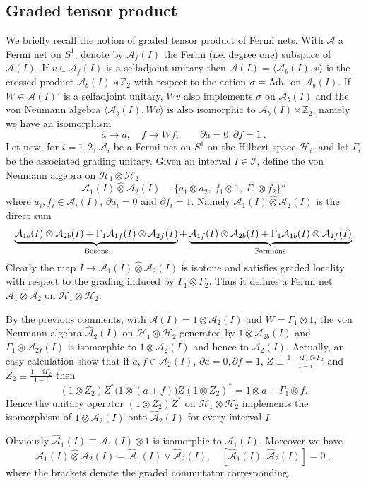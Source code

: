 \documentclass[11pt]{article}
\def\Ad{{\hbox{\rm Ad}}}
\def\A{{\cal A}}
\def\I{{\cal I}}
\def\H{{\cal H}}
\def\s{{\sigma}}
\def\A{{\mathcal A}}
\def\H{{\mathcal H}}
\def\I{{\mathcal I}}
\begin{document}
\subsection{Graded tensor product} 
We briefly recall the notion of graded tensor product of Fermi nets. With $\A$ a Fermi net on $S^1$, denote by $\A_f(I)$ the Fermi (i.e. degree one) subspace of $\A(I)$. If $v\in\A_f(I)$ is a selfadjoint unitary then $\A(I)= \langle\A_b(I),v\rangle$ is the crossed product $\A_b(I)\rtimes \mathbb Z_2$ with respect to the action $\s =\Ad v$ on $\A_b(I)$. If $W\in\A(I)'$ is a selfadjoint unitary, $W v$ also implements $\s$ on $\A_b(I)$ and the von Neumann algebra $\langle\A_b(I),W v\rangle$ is also isomorphic to $\A_b(I)\rtimes \mathbb Z_2$, namely we have an isomorphism
\[
a\to a,\quad f\to W f, \qquad \partial a = 0, \partial f = 1\ .
\]
Let now, for $i=1,2$, $\A_i$ be a Fermi net on $S^1$ on the Hilbert 
space $\H_i$, and let $\Gamma_i$ be the associated grading unitary. 
Given an interval $I\in\I$, define the von Neumann algebra on $\H_1\otimes\H_2$
\[
\A_1(I)\hat\otimes\A_2(I)\equiv
\{a_1\otimes a_2,\  f_1\otimes 1,\  \Gamma_1\otimes f_2\}''
\]
where $a_i,f_i\in\A_i(I)$, $\partial a_i =0$ and $\partial f_i =1$. Namely $\A_1(I)\hat\otimes\A_2(I) $ is the direct sum
\[
\underbrace{\A_{1b}(I)\otimes\A_{2b}(I) + \Gamma_1\A_{1f}(I)\otimes\A_{2f}(I)}_{\rm Bosons}
+ \underbrace{\A_{1f}(I)\otimes \A_{2b}(I) + \Gamma_1 \A_{1b}(I)\otimes\A_{2f}(I)}_{\rm Fermions}
\]
Clearly the map $I\to \A_1(I)\hat\otimes\A_2(I)$ is isotone and satisfies graded
locality with respect to the grading induced by $\Gamma_1 \otimes \Gamma_2$. 
Thus it defines a Fermi net $\A_1 \hat\otimes \A_2$ on $\H_1\otimes \H_2$. 

By the previous comments, with $\A(I) = 1 
\otimes \A_2(I)$ and $W=\Gamma_1\otimes 1$, the von Neumann algebra $\hat\A_2(I)$ on 
$\H_1\otimes\H_2$ generated by $1\otimes\A_{2b}(I)$ and $\Gamma_1\otimes \A_{2f}(I)$ 
is isomorphic to $1\otimes\A_2(I)$ and hence to $\A_2(I)$. Actually, an easy 
calculation show that 
if $a, f \in \A_2(I)$, $\partial a = 0, \partial f = 1$, 
$Z\equiv \frac{1-i\Gamma_1\otimes\Gamma_2}{1-i}$ and 
 $Z_2\equiv \frac{1-i\Gamma_2}{1-i}$ then
$$(1\otimes Z_2)Z^*\big(1\otimes (a+f)\big)Z(1\otimes Z_2)^*= 1\otimes a + 
\Gamma_1\otimes f.$$
Hence the unitary operator $(1\otimes Z_2)Z^*$ on $\H_1\otimes\H_2$ implements 
the isomorphism of $1\otimes\A_2(I)$ onto $\hat\A_2(I)$ for every interval $I$. 
  
Obviously $\hat\A_1(I)\equiv \A_1(I)\otimes 1$ is isomorphic to $\A_1(I)$. Moreover 
we have 
\begin{equation}
\label{gradedtensor}
\A_1(I)\hat\otimes\A_2(I) = \hat\A_1(I)\vee\hat\A_2(I),\quad [\hat\A_1(I),\hat\A_2(I)] = 0\ ,
\end{equation}
where the brackets denote the graded commutator corresponding.
\end{document}
